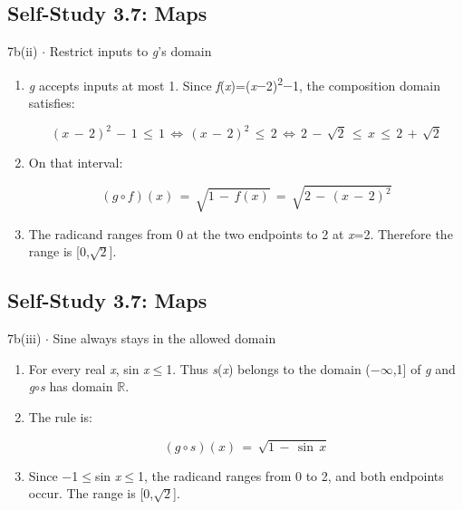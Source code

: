 \documentclass[11pt]{article}
\begin{document}
\begin{keepsection}\subsection{Self-Study 3.7: Maps}

\begin{workedbox}{7b(ii) \ensuremath{\cdot} Restrict inputs to \textit{g}’s domain}
\begin{enumerate}
\item {}
\textit{g} accepts inputs at most 1. Since \textit{f}(\textit{x})=(\textit{x}\ensuremath{-}2)\textsuperscript{2}\ensuremath{-}1, the composition domain satisfies:

\begin{equation*}({x}\, -\, 2)^{2}\, -\, 1\, \leq \, 1\, \Leftrightarrow \, ({x}\, -\, 2)^{2}\, \leq \, 2\, \Leftrightarrow \, 2\, -\, \sqrt{2}\, \leq \, {x}\, \leq \, 2\, +\, \sqrt{2}\end{equation*}
\item {}
On that interval:

\begin{equation*}({g}\circ {f})({x})\, =\, \sqrt{1\, -\, {f}({x})}\, =\, \sqrt{2\, -\, ({x}\, -\, 2)^{2}}\end{equation*}
\item The radicand ranges from 0 at the two endpoints to 2 at \textit{x}=2. Therefore the range is [0,\ensuremath{\sqrt{2}}].
\end{enumerate}
\end{workedbox}

\end{keepsection}
\begin{keepsection}\subsection{Self-Study 3.7: Maps}

\begin{workedbox}{7b(iii) \ensuremath{\cdot} Sine always stays in the allowed domain}
\begin{enumerate}
\item For every real \textit{x}, sin \textit{x}\ensuremath{\leq}1. Thus \textit{s}(\textit{x}) belongs to the domain (\ensuremath{-}\ensuremath{\infty},1] of \textit{g} and \textit{g}\ensuremath{\circ}\textit{s} has domain \ensuremath{\mathbb{R}}.
\item {}
The rule is:

\begin{equation*}({g}\circ {s})({x})\, =\, \sqrt{1\, -\, \sin \, {x}}\end{equation*}
\item Since \ensuremath{-}1\ensuremath{\leq}sin \textit{x}\ensuremath{\leq}1, the radicand ranges from 0 to 2, and both endpoints occur. The range is [0,\ensuremath{\sqrt{2}}].
\end{enumerate}
\end{workedbox}

\end{keepsection}
\end{document}
